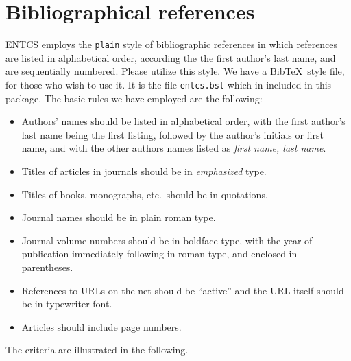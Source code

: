 \documentclass{entcs} \usepackage{entcsmacro}
\begin{document}
\section{Bibliographical references}\label{references}
ENTCS employs the \texttt{plain} style of bibliographic references in
which references are listed in alphabetical order, according the the
first author's last name, and are sequentially numbered. Please
utilize this style. We have a Bib\TeX\ style file, for those who wish
to use it. It is the file \texttt{entcs.bst} which in included in this
package. The basic rules we have employed are the following:
\begin{itemize}
\item Authors' names should be listed in alphabetical order, with the
  first author's last name being the first listing, followed by the
  author's initials or first name, and with the other authors names
  listed as \emph{first name, last name}.
\item Titles of articles in journals should be in \emph{emphasized}
  type.
\item Titles of books, monographs, etc.\ should be in quotations.
\item Journal names should be in plain roman type.
\item Journal volume numbers should be in boldface type, with the year
  of publication immediately following in roman type, and enclosed in
  parentheses.
\item References to URLs on the net should be ``active'' and the URL
  itself should be in typewriter font.
\item Articles should include page numbers.
\end{itemize}
The criteria are illustrated in the following.
\end{document}
